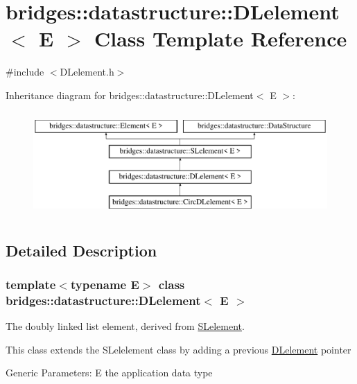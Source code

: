 \hypertarget{classbridges_1_1datastructure_1_1_d_lelement}{}\section{bridges\+:\+:datastructure\+:\+:D\+Lelement$<$ E $>$ Class Template Reference}
\label{classbridges_1_1datastructure_1_1_d_lelement}


{\ttfamily \#include $<$D\+Lelement.\+h$>$}

Inheritance diagram for bridges\+:\+:datastructure\+:\+:D\+Lelement$<$ E $>$\+:\begin{figure}[H]
\begin{center}
\leavevmode
\includegraphics[height=4.000000cm]{classbridges_1_1datastructure_1_1_d_lelement}
\end{center}
\end{figure}


\subsection{Detailed Description}
\subsubsection*{template$<$typename E$>$\newline
class bridges\+::datastructure\+::\+D\+Lelement$<$ E $>$}

The doubly linked list element, derived from \hyperlink{classbridges_1_1datastructure_1_1_s_lelement}{S\+Lelement}. 

This class extends the S\+Lelelement class by adding a previous \hyperlink{classbridges_1_1datastructure_1_1_d_lelement}{D\+Lelement} pointer

Generic Parameters\+: E the application data type

